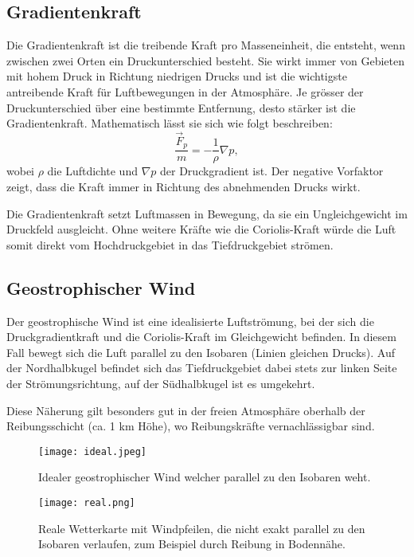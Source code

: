 \subsection{Gradientenkraft
\label{geostrophisch:subsection:gradient}}
Die Gradientenkraft ist die treibende Kraft pro Masseneinheit, die entsteht, wenn zwischen zwei Orten ein Druckunterschied besteht. Sie wirkt immer von Gebieten mit hohem Druck in Richtung niedrigen Drucks und ist die wichtigste antreibende Kraft für Luftbewegungen in der Atmosphäre. Je grösser der Druckunterschied über eine bestimmte Entfernung, desto stärker ist die Gradientenkraft.
Mathematisch lässt sie sich wie folgt beschreiben:
\begin{equation}
\frac{\vec{F}_p} {m}
= 
-\frac{1}{\rho} \nabla p
\label{geostrophisch:equation4},
\end{equation}
wobei $\rho$ die Luftdichte und $\nabla p$ der Druckgradient ist. 
Der negative Vorfaktor zeigt, dass die Kraft immer in Richtung des abnehmenden Drucks wirkt.

Die Gradientenkraft setzt Luftmassen in Bewegung, da sie ein Ungleichgewicht im Druckfeld ausgleicht. Ohne weitere Kräfte wie die Coriolis-Kraft würde die Luft somit direkt vom Hochdruckgebiet in das Tiefdruckgebiet strömen.
\subsection{Geostrophischer Wind}

Der geostrophische Wind ist eine idealisierte Luftströmung, bei der sich die Druckgradientkraft und die Coriolis-Kraft im Gleichgewicht befinden. In diesem Fall bewegt sich die Luft parallel zu den Isobaren (Linien gleichen Drucks). Auf der Nordhalbkugel befindet sich das Tiefdruckgebiet dabei stets zur linken Seite der Strömungsrichtung, auf der Südhalbkugel ist es umgekehrt.

Diese Näherung gilt besonders gut in der freien Atmosphäre oberhalb der Reibungsschicht (ca. 1 km Höhe), wo Reibungskräfte vernachlässigbar sind. 

\begin{figure}
    	\centering
    	\texttt{[image: ideal.jpeg]}
  	 \caption{Idealer geostrophischer Wind welcher parallel zu den Isobaren weht.}
   	\label{bild:ideal}
\end{figure}

\begin{figure}
    	\centering
    	\texttt{[image: real.png]}
  	 \caption{Reale Wetterkarte mit Windpfeilen, die nicht exakt parallel zu den Isobaren verlaufen, zum Beispiel durch Reibung in Bodennähe.}
   	\label{bild:real}
\end{figure}

